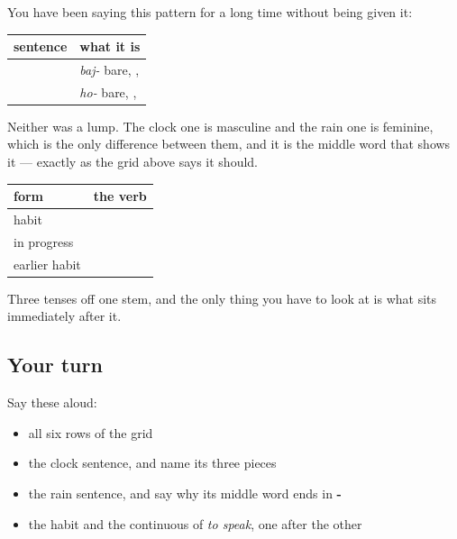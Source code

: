 \begin{grammarlens}[title={Grammar Lens: two sentences that were built this way all along}]
You have been saying this pattern for a long time without being given it:

\noindent
\begin{tabularx}{\linewidth}{@{}>{\raggedright\arraybackslash}X>{\raggedright\arraybackslash}X@{}}
\toprule
\textbf{sentence} & \textbf{what it is} \\
\midrule
\hi{एक} \hi{बज} \hi{रहा} \hi{है} & \emph{baj-} bare, \textbf{\hi{रहा}}, \textbf{\hi{है}} \\
\hi{बारिश} \hi{हो} \hi{रही} \hi{है} & \emph{ho-} bare, \textbf{\hi{रही}}, \textbf{\hi{है}} \\
\bottomrule
\end{tabularx}

Neither was a lump. The clock one is masculine and the rain one is feminine, which is the only difference between them, and it is the middle word that shows it — exactly as the grid above says it should.
\end{grammarlens}

\begin{grammarlens}[title={Grammar Lens: against the habit}]
\noindent
\begin{tabularx}{\linewidth}{@{}>{\raggedright\arraybackslash}X>{\raggedright\arraybackslash}X@{}}
\toprule
\textbf{form} & \textbf{the verb} \\
\midrule
habit & \hi{बोलता} \hi{हूँ} \\
in progress & \hi{बोल} \hi{रहा} \hi{हूँ} \\
earlier habit & \hi{बोलता} \hi{था} \\
\bottomrule
\end{tabularx}

Three tenses off one stem, and the only thing you have to look at is what sits immediately after it.
\end{grammarlens}

\subsection*{Your turn}
Say these aloud:

\begin{itemize}
\raggedright
  \item all six rows of the grid
  \item the clock sentence, and name its three pieces
  \item the rain sentence, and say why its middle word ends in \textbf{-}
  \item the habit and the continuous of \emph{to speak}, one after the other
\end{itemize}

